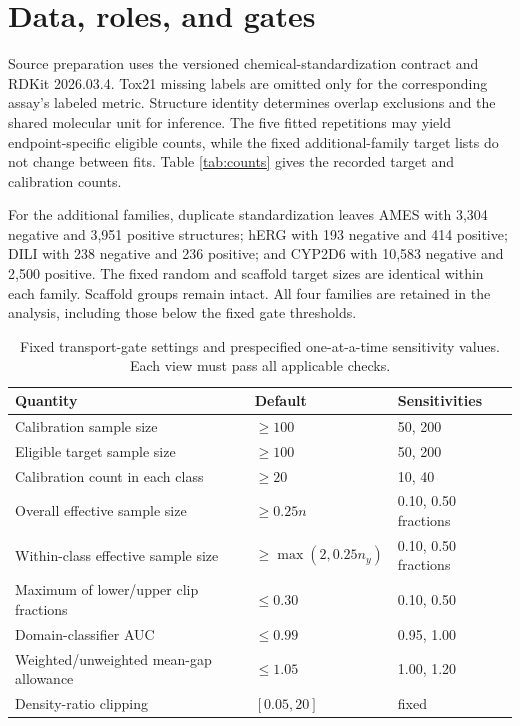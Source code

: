 \section{Data, roles, and gates}
Source preparation uses the versioned chemical-standardization contract and RDKit 2026.03.4. Tox21 missing labels are omitted only for the corresponding assay's labeled metric. Structure identity determines overlap exclusions and the shared molecular unit for inference. The five fitted repetitions may yield endpoint-specific eligible counts, while the fixed additional-family target lists do not change between fits. Table \ref{tab:counts} gives the recorded target and calibration counts.
\begin{table}[htbp]\centering\footnotesize
\caption{Target and calibration counts by assay and phase. Ranges span the five fit seeds. $N_0,N_1$ count observed target labels; calibration counts refer to the classical shared-predictor analysis.}\label{tab:counts}

\end{table}

For the additional families, duplicate standardization leaves AMES with 3,304 negative and 3,951 positive structures; hERG with 193 negative and 414 positive; DILI with 238 negative and 236 positive; and CYP2D6 with 10,583 negative and 2,500 positive. The fixed random and scaffold target sizes are identical within each family. Scaffold groups remain intact. All four families are retained in the analysis, including those below the fixed gate thresholds.

\begin{table}[htbp]\centering\small
\caption{Fixed transport-gate settings and prespecified one-at-a-time sensitivity values. Each view must pass all applicable checks.}\label{tab:gates}
\begin{tabular}{lll}\toprule
Quantity & Default & Sensitivities\\\midrule
Calibration sample size & $\ge100$ & 50, 200\\
Eligible target sample size & $\ge100$ & 50, 200\\
Calibration count in each class & $\ge20$ & 10, 40\\
Overall effective sample size & $\ge0.25n$ & 0.10, 0.50 fractions\\
Within-class effective sample size & $\ge\max(2,0.25n_y)$ & 0.10, 0.50 fractions\\
Maximum of lower/upper clip fractions & $\le0.30$ & 0.10, 0.50\\
Domain-classifier AUC & $\le0.99$ & 0.95, 1.00\\
Weighted/unweighted mean-gap allowance & $\le1.05$ & 1.00, 1.20\\
Density-ratio clipping & $[0.05,20]$ & fixed\\\bottomrule
\end{tabular}
\end{table}

